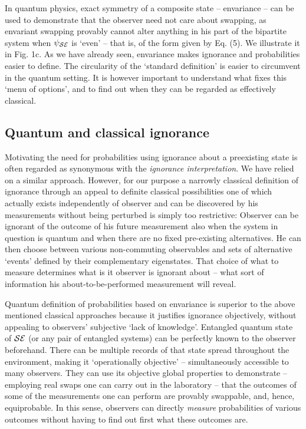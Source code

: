 \documentclass[aps,pra,epsfig,11pt,floatfix]{revtex4}
\begin{document}
In quantum physics, exact symmetry of a composite state -- envariance --
can be used to demonstrate that the observer need not care about swapping,
as envariant swapping provably cannot alter anything in his part of the
bipartite system when $\psi_{\cal SE}$ is `even' -- that is, of the form
given by Eq. (5). We illustrate it in Fig. 1c. As we have already seen, 
envariance makes ignorance and probabilities easier to define.  
The circularity of the `standard definition' is easier to circumvent
in the quantum setting. It is however important to understand what fixes
this `menu of options', and to find out when they can be regarded as
effectively classical. 

\subsection{Quantum and classical ignorance}

Motivating the need for probabilities using ignorance about a preexisting state
is often regarded as synonymous with the {\it ignorance interpretation}.  
We have relied on a similar approach. However, for our purpose
a narrowly classical definition of ignorance through an appeal to definite
classical possibilities one of which actually exists independently of observer
and can be discovered by his measurements without being perturbed is simply
too restrictive: Observer can be ignorant of the outcome of his future
measurement also when the system in question is quantum and when there
are no fixed pre-existing alternatives. He can then choose between various
non-commuting observables and sets of alternative `events' defined by
their complementary eigenstates. That choice of what to measure
determines what is it observer is ignorant about -- what sort of information 
his about-to-be-performed measurement will reveal.

Quantum definition of probabilities based on envariance is superior to the
above mentioned classical approaches because it justifies ignorance 
objectively, without appealing to observers' subjective `lack of knowledge'. 
Entangled quantum state of ${\cal SE}$ (or any pair of entangled systems)
can be perfectly known to the observer beforehand. There can be multiple 
records of that state spread throughout the environment, making it 
`operationally objective' -- simultaneously accessible to many observers. 
They can use its objective global properties to demonstrate -- employing real 
swaps one can carry out in the laboratory -- that the outcomes of some of 
the measurements one can perform are provably swappable, and, hence, 
equiprobable. In this sense, observers can directly {\it measure} probabilities 
of various outcomes without having to find out first what these outcomes are.
\end{document}
